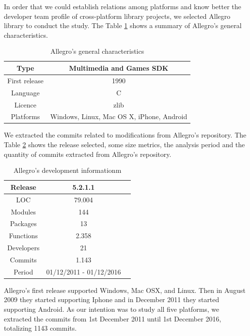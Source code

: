 \documentclass[10pt, conference]{IEEEtran}
\begin{document}
In order that we could establish relations among platforms and know better the developer team profile of cross-platform library projects, we selected Allegro library to conduct the study. The Table \ref{allegrogeneral} shows a summary of Allegro’s general characteristics.  

\begin{table}[h]
\renewcommand{\arraystretch}{1.3}
\caption{Allegro’s general characteristics}
\label{allegrogeneral}
\centering

\begin{tabular}{|c|c|}
\hline
Type & Multimedia and Games SDK \\
\hline
First release & 1990 \\
\hline
Language & C \\
\hline
Licence & zlib \\
\hline
Platforms & Windows, Linux, Mac OS X, iPhone, Android \\
\hline
\end{tabular}
\end{table}

We extracted the commits related to modifications from Allegro's repository. The Table \ref{allegroinfo} shows the release selected, some size metrics, the analysis period  and the quantity of commits extracted from Allegro's repository.  



\begin{table}[h]
\renewcommand{\arraystretch}{1.3}
\caption{Allegro’s development informationm}
\label{allegroinfo}
\centering
\begin{tabular}{|c|c|c|}
\hline
Release & 5.2.1.1\\
\hline
LOC & 79.004 \\
\hline
Modules & 144\\
\hline
Packages & 13\\
\hline
Functions & 2.358\\
\hline
Developers & 21 \\
\hline
Commits & 1.143  \\
\hline
Period & 01/12/2011 - 01/12/2016   \\
\hline
\end{tabular}
\end{table}

Allegro's first release supported Windows, Mac OSX, and Linux. Then in August 2009 they started supporting Iphone and in December 2011 they started supporting Android. As our intention was to study all five platforms, we extracted the commits from 1st December 2011 until 1st December 2016, totalizing 1143 commits.  
\end{document}

